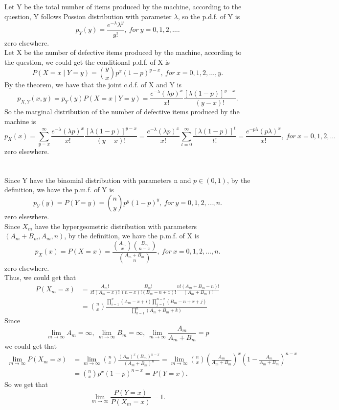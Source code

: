 \documentclass[10.5pt]{article}
\begin{document}
\section{}
Let Y be the total number of items produced by the machine, according to the question, Y follows Possion distribution with parameter $\lambda$, so the p.d.f. of Y is $$p_Y(y)=\frac{e^{-\lambda}\lambda^y}{y!},~for ~y=0,1,2,\dots.$$\indent
zero elsewhere.\\\indent
Let X be the number of defective items produced by the machine, according to the question, we could get the conditional p.d.f. of X is $$P(X=x\mid Y=y)=\binom{y}{x}p^x(1-p)^{y-x},~for ~x=0,1,2,\dots,y.$$\indent
By the theorem, we have that the joint c.d.f. of X and Y is $$p_{X,Y}(x,y)=p_Y(y)P(X=x\mid Y=y)=\frac{e^{-\lambda}(\lambda p)^x}{x!}\frac{[\lambda(1-p)]^{y-x}}{(y-x)!}.$$\indent
So the marginal distribution of the number of defective items produced by the machine is $$p_X(x)=\sum_{y=x}^{\infty}\frac{e^{-\lambda}(\lambda p)^x}{x!}\frac{[\lambda(1-p)]^{y-x}}{(y-x)!}=\frac{e^{-\lambda}(\lambda p)^x}{x!}\sum_{t=0}^{\infty}\frac{[\lambda(1-p)]^t}{t!}=\frac{e^{-p\lambda}(p\lambda)^x}{x!},~for ~x=0,1,2,\dots$$\indent
zero elsewhere.

\section{}
Since Y have the binomial distribution with parameters n and $p\in (0,1)$, by the definition, we have the p.m.f. of Y is $$p_Y(y)=P(Y=y)=\binom{n}{y}p^y(1-p)^y,~for ~y=0,1,2,\dots,n.$$ \indent
zero elsewhere.\\\indent
Since $X_m$ have the hypergeometric distribution with parameters $(A_m+B_m,A_m,n)$, by the definition, we have the p.m.f. of X is $$p_X(x)=P(X=x)=\frac{\binom{A_m}{x}\binom{B_m}{n-x}}{\binom{A_m+B_m}{n}},~for ~x=0,1,2,\dots,n.$$\indent
zero elsewhere.\\\indent
Thus, we could get that $$\begin{aligned}
    P(X_m=x)&=\frac{A_m!}{x!(A_m-x)!}\frac{B_m!}{(n-x)!(B_m-n+x)!}\frac{n!(A_m+B_m-n)!}{(A_m+B_m)!}\\
    &=\binom{n}{x}\frac{\prod_{i=1}^x(A_m-x+i)\prod_{j=1}^{n-x}(B_m-n+x+j)}{\prod_{k=1}^n(A_m+B_m+k)}
\end{aligned}$$\indent
Since $$\lim_{m\to\infty}A_m=\infty,~\lim_{m\to\infty}B_m=\infty,~\lim_{m\to\infty}\frac{A_m}{A_m+B_m}=p$$\indent
we could get that $$\begin{aligned}
    \lim_{m\to\infty}P(X_m=x)&=\lim_{m\to\infty}\binom{n}{x}\frac{(A_m)^x(B_m)^{n-x}}{(A_m+B_m)^n}=\lim_{m\to\infty}\binom{n}{x}\left(\frac{A_m}{A_m+B_m}\right)^x\left(1-\frac{A_m}{A_m+B_m}\right)^{n-x}\\
    &=\binom{n}{x}p^x(1-p)^{n-x}=P(Y=x).
\end{aligned}$$\indent
So we get that $$\lim_{m\to\infty}\frac{P(Y=x)}{P(X_m=x)}=1.$$
\end{document}
